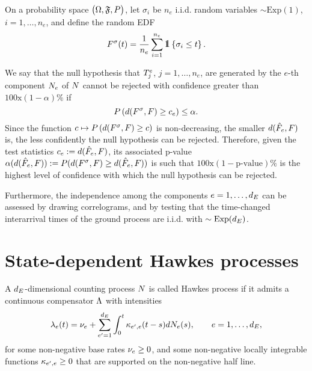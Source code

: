 \documentclass[10pt]{article}
\begin{document}
On a probability space $\big(\Omega,\mathfrak{F}, {{P}} \big)$, let $\sigma_i$ be $n_e$ i.i.d. random variables $\sim \text{Exp}(1)$, $i=1,\dots, n_e$, and define the random EDF 
\begin{equation*}
 F^{\sigma}(t) = \frac{1}{n_e}\sum_{i=1}^{n_e} \one \left\lbrace \sigma_i \leq t\right\rbrace.
\end{equation*}

We say that the null hypothesis that $T^{e}_{j}$, $j=1, \dots, n_e$, are generated by the $e$-th component $N_{e}$ of $N$ cannot be rejected with confidence greater than $100\text{x}(1-\alpha)\text{\%}$ if 
\begin{equation*}
 {{P}}\left( d(F^\sigma, F) \geq c_e \right) \leq \alpha.
\end{equation*}
Since the function $c \mapsto {{P}}\left( d(F^\sigma, F) \geq c \right)$ is non-decreasing, the smaller $d(\hat{F}_{e}, F)$ is, the less confidently the null hypothesis can be rejected. Therefore, given the test statistics $c_e:=d(\hat{F}_{e}, F)$, its associated p-value $\alpha(d(\hat{F}_{e},F)) := {{P}}(d(F^\sigma, F) \geq d(\hat{F}_{e},F))$ is such that $100\text{x}(1-\text{p-value})\text{\%}$ is the highest level of confidence with which the null hypothesis can be rejected.

Furthermore, the independence among the components $e=1,\dots, d_{E}$ can be assessed by drawing correlograms, and by testing that the time-changed interarrival times of the ground process are i.i.d. with $\sim \text{Exp}(d_{E})$.

\section{State-dependent Hawkes processes}

A $d_{E}$-dimensional counting process $N$ is called Hawkes process if it admits a continuous compensator $\Lambda$ with intensities 
\begin{equation}
 \lambda_{e}(t) = \nu_e + \sum_{e^{\prime}=1}^{d_{E}}\int_{0}^{t} \kappa_{e^{\prime},e}(t-s)dN_{e}(s), \qquad e=1,\dots,d_{E},
\end{equation}
for some non-negative base rates $\nu_e \geq 0$, and some non-negative locally integrable functions $\kappa_{e^{\prime},e} \geq 0$ that are supported on the non-negative half line.
\end{document}
